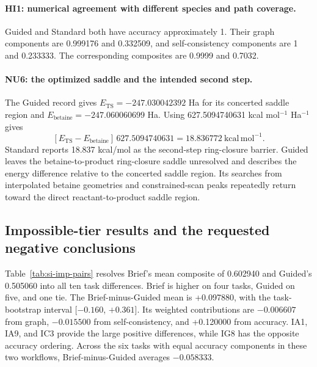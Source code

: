 \paragraph{HI1: numerical agreement with different species and path coverage.}
Guided and Standard both have accuracy approximately 1. Their graph components are 0.999176 and 0.332509, and self-consistency components are 1 and 0.233333. The corresponding composites are 0.9999 and 0.7032.

\paragraph{NU6: the optimized saddle and the intended second step.}
The Guided record gives $E_{\mathrm{TS}}=-247.030042392$ Ha for its concerted saddle region and $E_{\mathrm{betaine}}=-247.060060699$ Ha. Using 627.5094740631 kcal mol$^{-1}$ Ha$^{-1}$ gives
\begin{equation}
\left[E_{\mathrm{TS}}-E_{\mathrm{betaine}}\right]\,627.5094740631
=18.836772\ \mathrm{kcal\,mol^{-1}}.
\end{equation}
Standard reports 18.837 kcal/mol as the second-step ring-closure barrier. Guided leaves the betaine-to-product ring-closure saddle unresolved and describes the energy difference relative to the concerted saddle region. Its searches from interpolated betaine geometries and constrained-scan peaks repeatedly return toward the direct reactant-to-product saddle region.

\subsection{Impossible-tier results and the requested negative conclusions}

Table~\ref{tab:si-imp-pairs} resolves Brief's mean composite of 0.602940 and Guided's 0.505060 into all ten task differences. Brief is higher on four tasks, Guided on five, and one tie. The Brief-minus-Guided mean is +0.097880, with the task-bootstrap interval [$-0.160$, $+0.361$]. Its weighted contributions are $-0.006607$ from graph, $-0.015500$ from self-consistency, and +0.120000 from accuracy. IA1, IA9, and IC3 provide the large positive differences, while IG8 has the opposite accuracy ordering. Across the six tasks with equal accuracy components in these two workflows, Brief-minus-Guided averages $-0.058333$.

